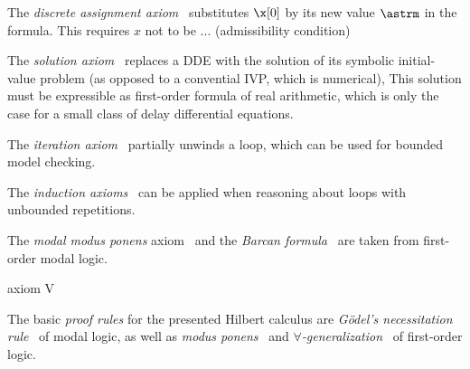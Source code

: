 \begin{calculus}
        \cinferenceRule[Vb|V]{}{
            \linferenceRule[impl]{
                \asfml
            }{
                \dbox{\asprg}{\asfml}
            }
        }{$\freevars{\asfml}\cap\boundvars{\asprg}=\emptyset$}


    \end{calculus}

    The \emph{discrete assignment axiom}~ substitutes $\x[0]$ by its new value $\astrm$ in the formula.
    This requires $x$ not to be ... (admissibility condition)

    The \emph{solution axiom}~ replaces a DDE with the solution of its symbolic initial-value problem (as opposed to a convential IVP, which is numerical), This solution must be expressible as first-order formula of real arithmetic, which is only the case for a small class of delay differential equations.

    The \emph{iteration axiom}~ partially unwinds a loop, which can be used for bounded model checking.

    The \emph{induction axioms}~
    can be applied when reasoning about loops with unbounded repetitions. 

    The \emph{modal modus ponens} axiom~ and the \emph{Barcan formula}~ are taken from first-order modal logic.

    axiom V

    The basic \emph{proof rules} for the presented Hilbert calculus are \emph{Gödel's necessitation rule}~ of modal logic, as well as \emph{modus ponens}~ and \emph{$\forall$-generalization}~ of first-order logic.


